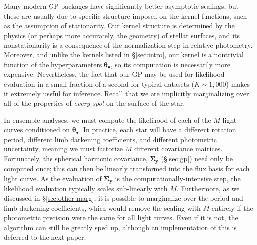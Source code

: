 \documentclass[modern]{aastex62}
\begin{document}
Many modern GP packages \citep[e.g.,][]{Ambikasaran2015,ForemanMackey2017}
have significantly better asymptotic scalings, but these are usually due to
specific structure imposed on the kernel functions, such as the assumption
of stationarity. Our kernel structure is determined by the physics (or perhaps
more accurately, the geometry) of stellar surfaces, and its nonstationarity
is a consequence of the normalization step in relative photometry. Moreover,
and unlike the kernels listed in \S\ref{sec:intro}, our
kernel is a nontrivial function of the hyperparameters
$\pmb{\theta}_\bullet$, so its computation is necessarily more expensive.
Nevertheless, the fact that our GP may be used for likelihood evaluation
in a small fraction of a second for typical datasets ($K \sim 1{,000}$)
makes it extremely useful for inference. Recall that we are implicitly
marginalizing over all of the properties of \emph{every spot} on the surface of
the star.

In ensemble analyses, we must compute the likelihood of each of the $M$ light curves
conditioned on $\pmb{\theta}_\bullet$. In practice, each star will have a
different rotation period, different limb darkening coefficients, and different
photometric uncertainty, meaning we must factorize $M$ different covariance
matrices. Fortunately, the spherical harmonic covariance, $\pmb{\Sigma}_\mathbf{y}$
(\S\ref{sec:gp}) need only be computed once; this can then be linearly
transformed into the flux basis for each light curve. As the evaluation of
$\pmb{\Sigma}_\mathbf{y}$ is the computationally-intensive step, the
likelihood evaluation typically scales sub-linearly with $M$. Furthermore,
as we discussed in \S\ref{sec:other-marg}, it is possible to marginalize over
the period and limb darkening coefficients, which would remove the scaling
with $M$ entirely if the photometric precision were the same for all
light curves. Even if it is not, the algorithm can still be greatly sped up,
although an implementation of this is deferred to the next paper.
\end{document}
